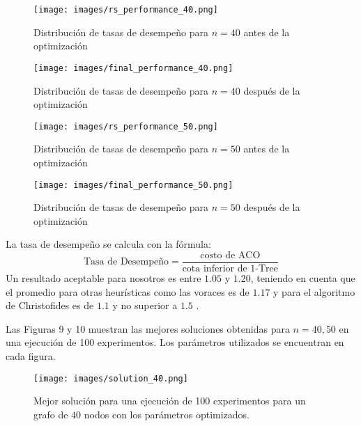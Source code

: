 \documentclass[conference]{IEEEtran}
\begin{document}
    \begin{figure}[htbp]
      \centering
      \begin{minipage}[t]{0.45\linewidth}
        \centering
        \texttt{[image: images/rs\_performance\_40.png]}
        \caption{Distribución de tasas de desempeño para $n=40$ antes de la optimización}
        \label{fig:image29}
      \end{minipage}
      \hfill
      \begin{minipage}[t]{0.45\linewidth}
        \centering
        \texttt{[image: images/final\_performance\_40.png]}
        \caption{Distribución de tasas de desempeño para $n=40$ después de la optimización}
        \label{fig:image30}
      \end{minipage}
      \begin{minipage}[t]{0.45\linewidth}
        \centering
        \texttt{[image: images/rs\_performance\_50.png]}
        \caption{Distribución de tasas de desempeño para $n=50$ antes de la optimización}
        \label{fig:image29}
      \end{minipage}
      \hfill
      \begin{minipage}[t]{0.45\linewidth}
        \centering
        \texttt{[image: images/final\_performance\_50.png]}
        \caption{Distribución de tasas de desempeño para $n=50$ después de la optimización}
        \label{fig:image30}
      \end{minipage}
    \end{figure}

La tasa de desempeño se calcula con la fórmula:
\begin{equation}
    \text{Tasa de Desempeño} = \frac{\text{costo de ACO}}{\text{cota inferior de 1-Tree}}
\end{equation}
Un resultado aceptable para nosotros es entre $1.05$ y $1.20$, teniendo en cuenta que el promedio para otras heurísticas como las voraces es de $1.17$ y para el algoritmo de Christofides es de $1.1$ y no superior a $1.5$ \cite{aco_youtube}\cite{chris_wiki}.

Las Figuras 9 y 10 muestran las mejores soluciones obtenidas para $n=40, 50$ en una ejecución de 100 experimentos. Los parámetros utilizados se encuentran en cada figura.

\begin{figure}[htbp]
  \centering
  \texttt{[image: images/solution\_40.png]}
  \caption{Mejor solución para una ejecución de 100 experimentos para un grafo de $40$ nodos con los parámetros optimizados.}
  \label{fig:image20}
\end{figure}
\end{document}
